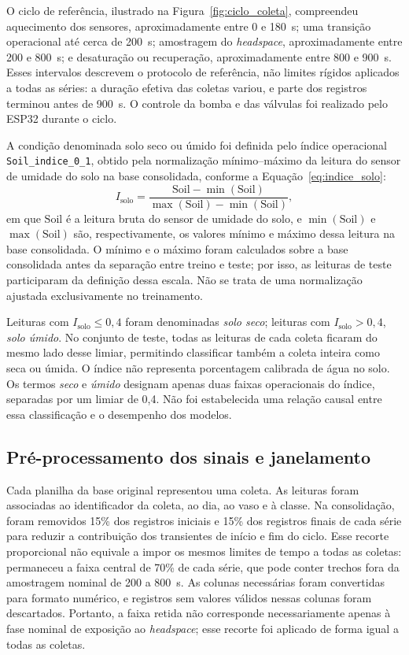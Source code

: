 O ciclo de referência, ilustrado na Figura~\ref{fig:ciclo_coleta},
compreendeu aquecimento dos sensores, aproximadamente entre 0 e 180~s; uma
transição operacional até cerca de 200~s; amostragem do \textit{headspace},
aproximadamente entre 200 e 800~s; e desaturação ou recuperação,
aproximadamente entre 800 e 900~s. Esses intervalos descrevem o protocolo de
referência, não limites rígidos aplicados a todas as séries: a duração efetiva
das coletas variou, e parte dos registros terminou antes de 900~s. O controle
da bomba e das válvulas foi realizado pelo ESP32 durante o ciclo.

A condição denominada solo seco ou úmido foi definida pelo índice operacional
\texttt{Soil\_indice\_0\_1}, obtido pela normalização mínimo--máximo da leitura
do sensor de umidade do solo na base consolidada, conforme a
Equação~\eqref{eq:indice_solo}:
\begin{equation}
    I_{\mathrm{solo}} =
    \frac{\mathrm{Soil}-\min(\mathrm{Soil})}
         {\max(\mathrm{Soil})-\min(\mathrm{Soil})},
    \label{eq:indice_solo}
\end{equation}
em que $\mathrm{Soil}$ é a leitura bruta do sensor de umidade do solo, e
$\min(\mathrm{Soil})$ e $\max(\mathrm{Soil})$ são, respectivamente, os valores
mínimo e máximo dessa leitura na base consolidada.
O mínimo e o máximo foram calculados sobre a base consolidada antes da
separação entre treino e teste; por isso, as leituras de teste participaram
da definição dessa escala. Não se trata de uma normalização ajustada
exclusivamente no treinamento.

Leituras com $I_{\mathrm{solo}}\leq 0{,}4$ foram denominadas \emph{solo seco};
leituras com $I_{\mathrm{solo}}>0{,}4$, \emph{solo úmido}. No conjunto de
teste, todas as leituras de cada coleta ficaram do mesmo lado desse limiar,
permitindo classificar também a coleta inteira como seca ou úmida. O índice não
representa porcentagem calibrada de água no solo. Os termos \emph{seco} e
\emph{úmido} designam apenas duas faixas operacionais do índice, separadas
por um limiar de 0,4. Não foi estabelecida uma relação causal entre essa
classificação e o desempenho dos modelos.

\subsection{Pré-processamento dos sinais e janelamento}
\label{subsec:preprocessamento}

Cada planilha da base original representou uma coleta. As leituras foram
associadas ao identificador da coleta, ao dia, ao vaso e à classe. Na
consolidação, foram removidos 15\% dos registros iniciais e 15\% dos
registros finais de cada série para reduzir a contribuição dos transientes
de início e fim do ciclo. Esse recorte proporcional não equivale a impor
os mesmos limites de tempo a todas as coletas: permaneceu a faixa central
de 70\% de cada série, que pode conter trechos fora da amostragem nominal
de 200 a 800~s. As colunas necessárias foram
convertidas para formato numérico, e registros sem valores válidos nessas
colunas foram descartados.
Portanto, a faixa retida não corresponde necessariamente apenas à fase
nominal de exposição ao \textit{headspace}; esse recorte foi aplicado de
forma igual a todas as coletas.

